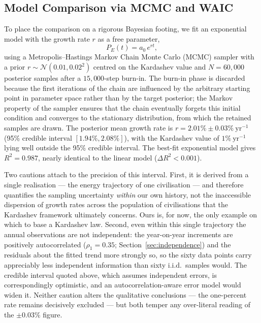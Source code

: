 \subsection{Model Comparison via MCMC and WAIC}
\label{sec:mcmc}

To place the comparison on a rigorous Bayesian footing, we fit an exponential model with
the growth rate $r$ as a free parameter,
\begin{equation}
\label{eq:exp}
P_E(t) = a_0\, e^{rt},
\end{equation}
using a Metropolis--Hastings Markov Chain Monte Carlo (MCMC) sampler
\citep{Metropolis1953,Hastings1970} with a prior $r\sim\mathcal{N}(0.01, 0.02^2)$ centred
on the Kardashev value and $N=60{,}000$ posterior samples after a $15{,}000$-step
burn-in. The burn-in phase is discarded because the first iterations of the chain are
influenced by the arbitrary starting point in parameter space rather than by the target
posterior; the Markov property of the sampler ensures that the chain eventually forgets
this initial condition and converges to the stationary distribution, from which the
retained samples are drawn. The posterior mean growth rate is
$r=2.01\%\pm0.03\%~\mathrm{yr^{-1}}$ (95\% credible interval $[1.94\%, 2.08\%]$), with
the Kardashev value of $1\%~\mathrm{yr^{-1}}$ lying well outside the 95\% credible
interval. The best-fit exponential model gives $R^2=0.987$, nearly identical to the
linear model ($\Delta R^2 < 0.001$).

Two cautions attach to the precision of this interval. First, it is derived from a single
realisation --- the energy trajectory of one civilisation --- and therefore quantifies the
sampling uncertainty \emph{within} our own history, not the inaccessible dispersion of
growth rates across the population of civilisations that the Kardashev framework ultimately
concerns. Ours is, for now, the only example on which to base a Kardashev law. Second, even
within this single trajectory the annual observations are not independent: the year-on-year
increments are positively autocorrelated ($\rho_1=0.35$; Section~\ref{sec:independence})
and the residuals about the fitted trend more strongly so, so the sixty data points carry
appreciably less independent information than sixty i.i.d.\ samples would. The credible
interval quoted above, which assumes independent errors, is correspondingly optimistic, and
an autocorrelation-aware error model would widen it. Neither caution alters the qualitative
conclusions --- the one-percent rate remains decisively excluded --- but both temper any
over-literal reading of the $\pm0.03\%$ figure.

